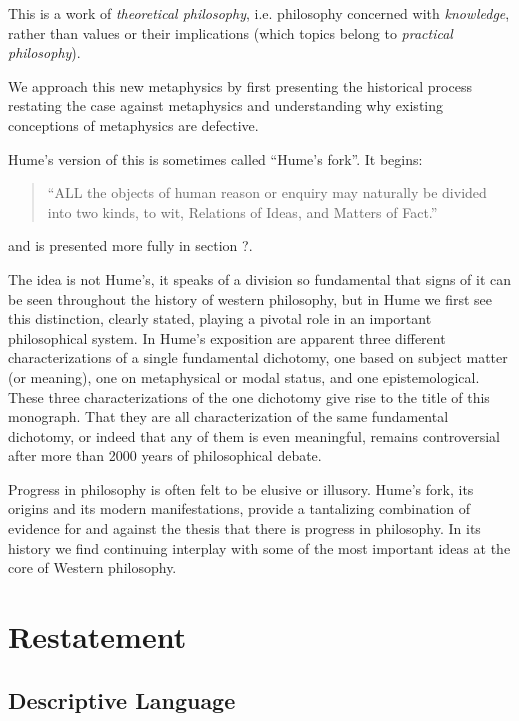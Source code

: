 This is a work of {\it theoretical philosophy}, i.e. philosophy concerned with {\it knowledge}, rather than values or their implications (which topics belong to {\it practical philosophy}).

We approach this new metaphysics by first presenting the historical process restating the case against metaphysics and understanding why existing conceptions of metaphysics are defective.

Hume's version of this is sometimes called ``Hume's fork''.
It begins:

\begin{quote}
``ALL the objects of human reason or enquiry may naturally be divided into two kinds, to wit, Relations of Ideas, and Matters of Fact.''
\end{quote}

and is presented more fully in section ?.

The idea is not Hume's, it speaks of a division so fundamental that signs of it can be seen throughout the history of western philosophy, but in Hume we first see this distinction, clearly stated, playing a pivotal role in an important philosophical system.
In Hume's exposition are apparent three different characterizations of a single fundamental dichotomy, one based on subject matter (or meaning), one on metaphysical or modal status, and one epistemological.
These three characterizations of the one dichotomy give rise to the title of this monograph.
That they are all characterization of the same fundamental dichotomy, or indeed that any of them is even meaningful, remains controversial after more than 2000 years of philosophical debate. 

Progress in philosophy is often felt to be elusive or illusory.
Hume's fork, its origins and its modern manifestations, provide a tantalizing combination of evidence for and against the thesis that there is progress in philosophy.
In its history we find continuing interplay with some of the most important ideas at the core of Western philosophy.

\chapter{Restatement}\label{Restatement}

\section{Descriptive Language}


